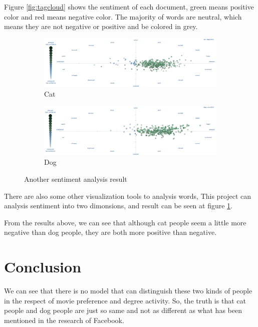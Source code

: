 \documentclass[12pt]{article}
\begin{document}
Figure \ref{fig:tagcloud} shows the sentiment of each document, green means positive color and red means negative color. The majority of words are neutral, which means they are not negative or positive and be colored in grey.

\begin{figure}[h!]
  \centering
  \begin{subfigure}[b]{0.6\linewidth}
    \includegraphics[width=\linewidth]{../Sentiment/cat.png}
    \caption{Cat}
  \end{subfigure}
  \begin{subfigure}[b]{0.6\linewidth}
    \includegraphics[width=\linewidth]{../Sentiment/dog.png}
    \caption{Dog}
  \end{subfigure}
  \caption{Another sentiment analysis result}
  \label{fig:twitter}
\end{figure}

There are also some other visualization tools to analysis words, This project \cite{healey} can analysis sentiment into two dimonsions, and result can be seen at figure \ref{fig:twitter}.

From the results above, we can see that although cat people seem a little more negative than dog people, they are both more positive than negative.


\section{Conclusion}
We can see that there is no model that can distinguish these two kinds of people in the respect of movie preference and degree activity. So, the truth is that cat people and dog people are just so same and not as different as what has been mentioned in the research of Facebook.
\end{document}
